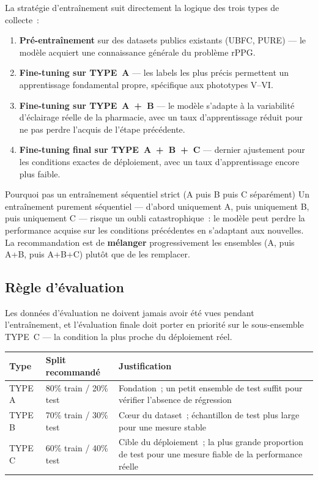 \documentclass[11pt,a4paper]{article}
\begin{document}
La strat\'egie d'entra\^inement suit directement la logique des trois types
de collecte~:

\begin{enumerate}
\item \textbf{Pr\'e-entra\^inement} sur des datasets publics existants
(UBFC, PURE) --- le mod\`ele acquiert une connaissance g\'en\'erale du
probl\`eme rPPG.
\item \textbf{Fine-tuning sur TYPE~A} --- les labels les plus pr\'ecis
permettent un apprentissage fondamental propre, sp\'ecifique aux phototypes
V--VI.
\item \textbf{Fine-tuning sur TYPE~A~+~B} --- le mod\`ele s'adapte \`a la
variabilit\'e d'\'eclairage r\'eelle de la pharmacie, avec un taux
d'apprentissage r\'eduit pour ne pas perdre l'acquis de l'\'etape
pr\'ec\'edente.
\item \textbf{Fine-tuning final sur TYPE~A~+~B~+~C} --- dernier ajustement
pour les conditions exactes de d\'eploiement, avec un taux d'apprentissage
encore plus faible.
\end{enumerate}

\begin{warnbox}{Pourquoi pas un entra\^inement s\'equentiel strict
(A puis B puis C s\'epar\'ement)}
Un entra\^inement purement s\'equentiel --- d'abord uniquement A, puis
uniquement B, puis uniquement C --- risque un oubli catastrophique~: le
mod\`ele peut perdre la performance acquise sur les conditions pr\'ec\'edentes
en s'adaptant aux nouvelles. La recommandation est de \textbf{m\'elanger}
progressivement les ensembles (A, puis A+B, puis A+B+C) plut\^ot que de les
remplacer.
\end{warnbox}

\subsection{R\`egle d'\'evaluation}

Les donn\'ees d'\'evaluation ne doivent jamais avoir \'et\'e vues pendant
l'entra\^inement, et l'\'evaluation finale doit porter en priorit\'e sur le
sous-ensemble TYPE~C --- la condition la plus proche du d\'eploiement r\'eel.

\begin{center}
\begin{tabularx}{\textwidth}{P{3cm} P{3cm} X}
\toprule
\textbf{Type} & \textbf{Split recommand\'e} & \textbf{Justification} \\
\midrule
TYPE A & 80\% train / 20\% test & Fondation~; un petit ensemble de test
suffit pour v\'erifier l'absence de r\'egression \\
TYPE B & 70\% train / 30\% test & Cœur du dataset~; \'echantillon de test
plus large pour une mesure stable \\
TYPE C & 60\% train / 40\% test & Cible du d\'eploiement~; la plus grande
proportion de test pour une mesure fiable de la performance r\'eelle \\
\bottomrule
\end{tabularx}
\end{center}
\end{document}
